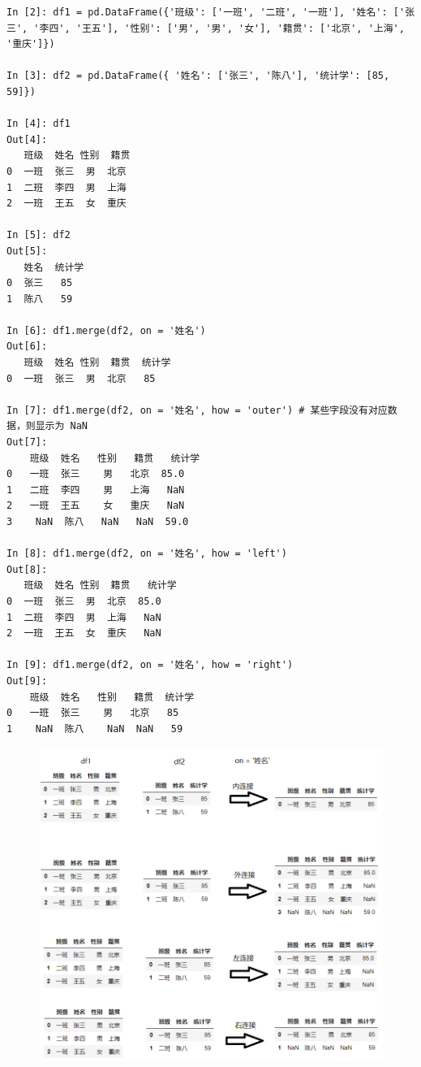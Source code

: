 \begin{lstlisting}[Language=Python]
In [2]: df1 = pd.DataFrame({'班级': ['一班', '二班', '一班'], '姓名': ['张三', '李四', '王五'], '性别': ['男', '男', '女'], '籍贯': ['北京', '上海', '重庆']})

In [3]: df2 = pd.DataFrame({ '姓名': ['张三', '陈八'], '统计学': [85, 59]})

In [4]: df1
Out[4]:
   班级  姓名 性别  籍贯
0  一班  张三  男  北京
1  二班  李四  男  上海
2  一班  王五  女  重庆

In [5]: df2
Out[5]:
   姓名  统计学
0  张三   85
1  陈八   59

In [6]: df1.merge(df2, on = '姓名')
Out[6]:
   班级  姓名 性别  籍贯  统计学
0  一班  张三  男  北京   85

In [7]: df1.merge(df2, on = '姓名', how = 'outer') # 某些字段没有对应数据，则显示为 NaN
Out[7]:
    班级  姓名   性别   籍贯   统计学
0   一班  张三    男   北京  85.0
1   二班  李四    男   上海   NaN
2   一班  王五    女   重庆   NaN
3    NaN  陈八   NaN   NaN  59.0

In [8]: df1.merge(df2, on = '姓名', how = 'left')
Out[8]:
   班级  姓名 性别  籍贯   统计学
0  一班  张三  男  北京  85.0
1  二班  李四  男  上海   NaN
2  一班  王五  女  重庆   NaN

In [9]: df1.merge(df2, on = '姓名', how = 'right')
Out[9]:
    班级  姓名   性别   籍贯  统计学
0   一班  张三    男   北京   85
1    NaN  陈八    NaN  NaN   59
\end{lstlisting}


\begin{figure}[!ht]
\centering
  \includegraphics[scale=0.75]{figure/merge.png}
\end{figure}


